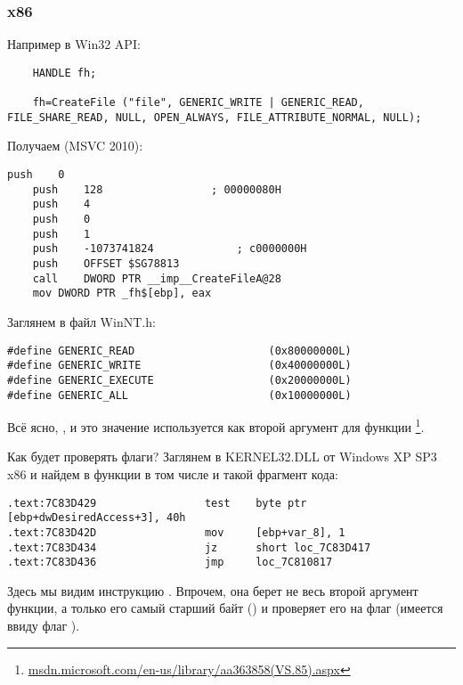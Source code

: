 \subsubsection{x86}

Например в Win32 API:

\begin{lstlisting}
	HANDLE fh;

	fh=CreateFile ("file", GENERIC_WRITE | GENERIC_READ, FILE_SHARE_READ, NULL, OPEN_ALWAYS, FILE_ATTRIBUTE_NORMAL, NULL);
\end{lstlisting}

Получаем (MSVC 2010):

\begin{lstlisting}[caption=MSVC 2010]
	push	0
	push	128					; 00000080H
	push	4
	push	0
	push	1
	push	-1073741824				; c0000000H
	push	OFFSET $SG78813
	call	DWORD PTR __imp__CreateFileA@28
	mov	DWORD PTR _fh$[ebp], eax
\end{lstlisting}

Заглянем в файл WinNT.h:

\begin{lstlisting}[caption=WinNT.h]
#define GENERIC_READ                     (0x80000000L)
#define GENERIC_WRITE                    (0x40000000L)
#define GENERIC_EXECUTE                  (0x20000000L)
#define GENERIC_ALL                      (0x10000000L)
\end{lstlisting}

Всё ясно, 
, 
и это значение используется как второй аргумент для функции
 \footnote{\href{http://go.yurichev.com/17065}{msdn.microsoft.com/en-us/library/aa363858(VS.85).aspx}}.

Как  будет проверять флаги?
Заглянем в KERNEL32.DLL от Windows XP SP3 x86 и найдем в функции  в том числе и 
такой фрагмент кода:

\begin{lstlisting}[caption=KERNEL32.DLL (Windows XP SP3 x86)]
.text:7C83D429                 test    byte ptr [ebp+dwDesiredAccess+3], 40h
.text:7C83D42D                 mov     [ebp+var_8], 1
.text:7C83D434                 jz      short loc_7C83D417
.text:7C83D436                 jmp     loc_7C810817
\end{lstlisting}

Здесь мы видим инструкцию \TEST. Впрочем, она берет не весь второй аргумент функции, 
а только его самый старший байт () и проверяет его на флаг 
(имеется ввиду флаг ).

